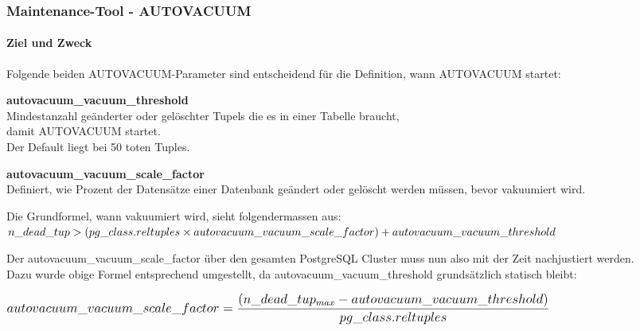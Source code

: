 
\begin{flushleft}
    \subsubsection{Maintenance-Tool - AUTOVACUUM}
    \paragraph{Ziel und Zweck}
    Folgende beiden \Gls{AUTOVACUUM}-Parameter sind entscheidend für die Definition, wann \Gls{AUTOVACUUM} startet:
    \begin{description}
        \item \textbf{autovacuum\_vacuum\_threshold}\hfill \\Mindestanzahl geänderter oder gelöschter Tupels die es in einer Tabelle braucht,\\damit \Gls{AUTOVACUUM} startet.\\Der Default liegt bei 50 toten Tuples.
        \item \textbf{autovacuum\_vacuum\_scale\_factor}\hfill \\Definiert, wie Prozent der Datensätze einer Datenbank geändert oder gelöscht werden müssen, bevor vakuumiert wird.
    \end{description}

    Die Grundformel, wann vakuumiert wird, sieht folgendermassen aus:\\
    \(\mathlarger{n\_dead\_tup > (pg\_class.reltuples \times autovacuum\_vacuum\_scale\_factor) + autovacuum\_vacuum\_threshold}\)
\end{flushleft}
\begin{flushleft}
    Der autovacuum\_vacuum\_scale\_factor über den gesamten \Gls{PostgreSQL Cluster} muss nun also mit der Zeit nachjustiert werden.\\
    Dazu wurde obige Formel entsprechend umgestellt, da autovacuum\_vacuum\_threshold grundsätzlich statisch bleibt:
\end{flushleft}
\begin{flushleft}
    \(\mathlarger{\mathlarger{autovacuum\_vacuum\_scale\_factor = \dfrac{(n\_dead\_tup_{max} - autovacuum\_vacuum\_threshold)}{pg\_class.reltuples}}}\)
\end{flushleft}
